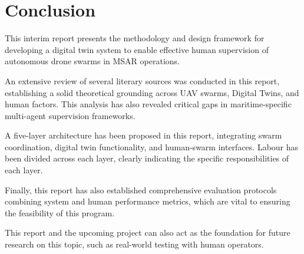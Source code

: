 \section{Conclusion}\label{sec:conclusion}

This interim report presents the methodology and design framework for developing a digital twin system to enable effective human supervision of autonomous drone swarms in MSAR operations.

An extensive review of several literary sources was conducted in this report, establishing a solid theoretical grounding across UAV swarms, Digital Twins, and human factors.
This analysis has also revealed critical gaps in maritime-specific multi-agent supervision frameworks.

A five-layer architecture has been proposed in this report, integrating swarm coordination, digital twin functionality, and human-swarm interfaces.
Labour has been divided across each layer, clearly indicating the specific responsibilities of each layer.

Finally, this report has also established comprehensive evaluation protocols combining system and human performance metrics, which are vital to ensuring the feasibility of this program.

This report and the upcoming project can also act as the foundation for future research on this topic, such as real-world testing with human operators.
